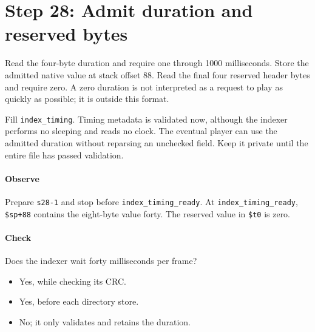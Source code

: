 \section{Step 28: Admit duration and reserved bytes}
Read the four-byte duration and require one through 1000 milliseconds.
Store the admitted native value at stack offset 88. Read the final four reserved
header bytes and require zero. A zero duration is not interpreted as a request
to play as quickly as possible; it is outside this format.

Fill \texttt{index\_timing}. Timing metadata is validated now, although the
indexer performs no sleeping and reads no clock. The eventual player can use
the admitted duration without reparsing an unchecked field. Keep it private
until the entire file has passed validation.

\paragraph{Observe} Prepare \texttt{s28-1} and stop before
\texttt{index\_timing\_ready}. At \texttt{index\_timing\_ready}, \texttt{\$sp+88} contains
the eight-byte value forty. The reserved value in \texttt{\$t0} is zero.

\paragraph{Check} Does the indexer wait forty milliseconds per frame?
\begin{itemize}
  \item[A.] Yes, while checking its CRC.
  \item[B.] Yes, before each directory store.
  \item[C.] No; it only validates and retains the duration.
\end{itemize}
